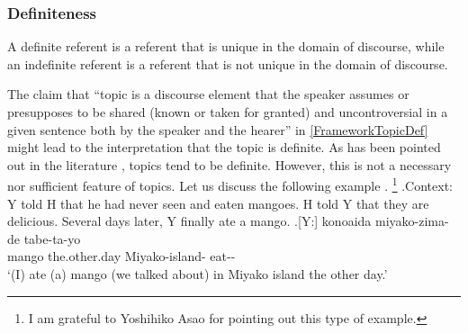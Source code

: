 \subsubsection{Definiteness}\label{Fr:Definition:TFFeathers:Definite}

A definite referent is a referent
that is unique in the domain of discourse,
while an indefinite referent is a referent
that is not unique in the domain of discourse.

The claim that ``topic is a discourse element that the speaker assumes or presupposes to be shared (known or taken for granted) and uncontroversial in a given sentence both by the speaker and the hearer'' in \ref{FrameworkTopicDef} 
might lead to the interpretation that the topic is definite.
As has been pointed out in the literature \cite{givon76,keenan76,comrie79,comrie83},
topics tend to be definite.
However, this is not a necessary nor sufficient feature of topics.
Let us discuss the following example \Next.%
	\footnote{
	I am grateful to Yoshihiko Asao
	for pointing out this type of example.
	}
\ex.\label{Fr:Definition:TFFeathers:Definite:Ex:Mango1}Context:
	Y told H that he had never seen and eaten mangoes.
	H told Y that they are delicious.
	Several days later, Y finally ate a mango.
	\ag.[Y:]  konoaida miyako-zima-de tabe-ta-yo \\
			mango the.other.day Miyako-island- eat-- \\
			`(I) ate (a) mango (we talked about) in Miyako island the other day.'

